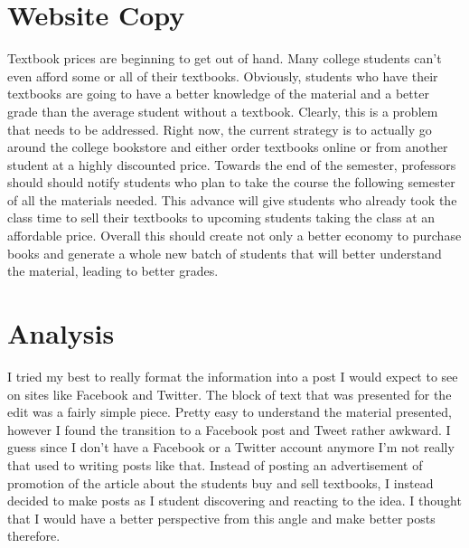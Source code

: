 \documentclass[10pt,letterpaper]{article}
\begin{document}
\section*{Website Copy}
Textbook prices are beginning to get out of hand. Many college students can't even afford some or all of their textbooks. Obviously, students who have their textbooks are going to have a better knowledge of the material and a better grade than the average student without a textbook. Clearly, this is a problem that needs to be addressed. Right now, the current strategy is to actually go around the college bookstore and either order textbooks online or from another student at a highly discounted price. Towards the end of the semester, professors should should notify students who plan to take the course the following semester of all the materials needed. This advance will give students who already took the class time to sell their textbooks to upcoming students taking the class at an affordable price. Overall this should create not only a better economy to purchase books and generate a whole new batch of students that will better understand the material, leading to better grades. 

\section*{Analysis}
I tried my best to really format the information into a post I would expect to see on sites like Facebook and Twitter. The block of text that was presented for the edit was a fairly simple piece. Pretty easy to understand the material presented, however I found the transition to a Facebook post and Tweet rather awkward. I guess since I don't have a Facebook or a Twitter account anymore I'm not really that used to writing posts like that. Instead of posting an advertisement of promotion of the article about the students buy and sell textbooks, I instead decided to make posts as I student discovering and reacting to the idea. I thought that I would have a better perspective from this angle and make better posts therefore. 
\end{document}

